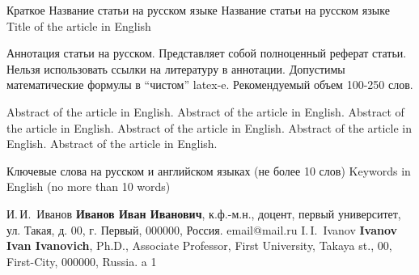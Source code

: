 



\usepackage{graphicx}



\Title%
	{Краткое Название статьи на русском языке} %
	{Название статьи на русском языке} %
	{Title of the article in English} %


\Abstract%
{
Аннотация статьи на русском. Представляет собой полноценный реферат статьи. Нельзя использовать ссылки на литературу в аннотации. Допустимы математические формулы в ``чистом'' latex-e. Рекомендуемый объем 100-250 слов.

}%
{
Abstract of the article in English. Abstract of the article in English. Abstract of the article in English. Abstract of the article in English. Abstract of the article in English. Abstract of the article in English.
	
}

\Key%
  {Ключевые слова на русском и английском языках (не более 10 слов)}%
  {Keywords in English (no more than 10 words)}%


\Author%
{И.\,И.~Иванов} %
{\textbf{Иванов Иван Иванович}, к.ф.-м.н., доцент,  первый университет, ул. Такая, д. 00, г. Первый, 000000, Россия.}
{email@mail.ru} %
{I.\,I.~Ivanov}%
{\textbf{Ivanov Ivan Ivanovich}, Ph.D., Associate Professor, First University, Takaya st., 00, First-City, 000000, Russia.}
{a} %
{1} %

